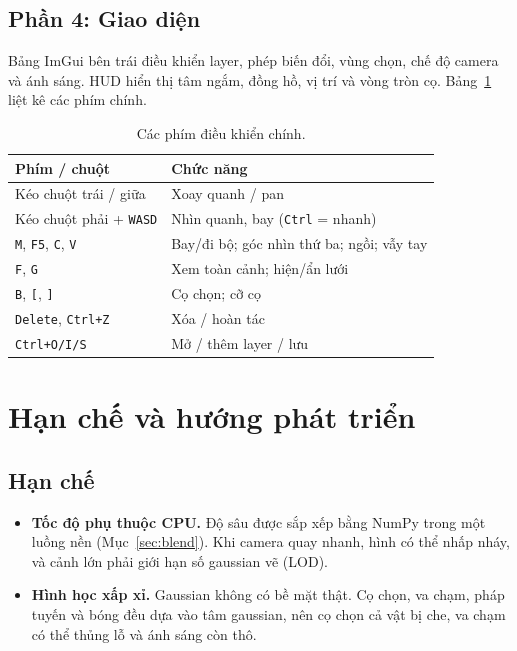 \documentclass[9pt,twocolumn,a4paper]{extarticle}
\newcommand{\code}[1]{\texttt{#1}}
\begin{document}
\subsection{Phần 4: Giao diện}
Bảng ImGui bên trái điều khiển layer, phép biến đổi, vùng chọn, chế độ camera và ánh sáng. HUD hiển thị tâm ngắm, đồng hồ, vị trí và vòng tròn cọ. Bảng~\ref{tab:keys} liệt kê các phím chính.
\begin{table}[H]
\centering
\caption{Các phím điều khiển chính.}
\label{tab:keys}
\footnotesize
\begin{tabular}{@{}p{3.1cm}p{4.6cm}@{}}
\toprule
Phím / chuột & Chức năng \\
\midrule
Kéo chuột trái / giữa & Xoay quanh / pan \\
Kéo chuột phải + \code{WASD} & Nhìn quanh, bay (\code{Ctrl} = nhanh) \\
\code{M}, \code{F5}, \code{C}, \code{V} & Bay/đi bộ; góc nhìn thứ ba; ngồi; vẫy tay \\
\code{F}, \code{G} & Xem toàn cảnh; hiện/ẩn lưới \\
\code{B}, \code{[}, \code{]} & Cọ chọn; cỡ cọ \\
\code{Delete}, \code{Ctrl+Z} & Xóa / hoàn tác \\
\code{Ctrl+O/I/S} & Mở / thêm layer / lưu \\
\bottomrule
\end{tabular}
\end{table}

\section{Hạn chế và hướng phát triển}
\label{chap:future}
\subsection{Hạn chế}
\begin{itemize}\itemsep0pt
\item \textbf{Tốc độ phụ thuộc CPU.} Độ sâu được sắp xếp bằng NumPy trong một luồng nền (Mục~\ref{sec:blend}). Khi camera quay nhanh, hình có thể nhấp nháy, và cảnh lớn phải giới hạn số gaussian vẽ (LOD).
\item \textbf{Hình học xấp xỉ.} Gaussian không có bề mặt thật. Cọ chọn, va chạm, pháp tuyến và bóng đều dựa vào tâm gaussian, nên cọ chọn cả vật bị che, va chạm có thể thủng lỗ và ánh sáng còn thô.
\end{itemize}
\end{document}
